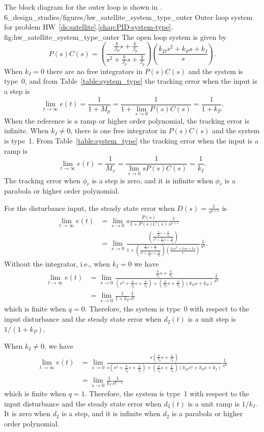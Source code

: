 The block diagram for the outer loop is shown in .
	{6_design_studies/figures/hw_satellite_system_type_outer}
	{Outer loop system for problem HW~\ref{ds:satellite}.\ref{chap:PID-system-type}.}
	{fig:hw_satellite_system_type_outer}
The open loop system is given by
\[
P(s)C(s) = \left(\frac{\frac{b}{J_P}s+\frac{k}{J_p}}{s^2+\frac{b}{J_p}s+\frac{k}{J_p}}\right)\left(\frac{k_Ds^2+k_Ps+k_I}{s}\right).
\]
When $k_I=0$ there are no free integrators in $P(s)C(s)$ and the system is type~0, and from Table~\ref{table:system_type} the tracking error when the input is a step is \[
\lim_{t\to\infty}e(t) = \frac{1}{1+M_p} = \frac{1}{1+\lim_{s\to 0} P(s)C(s)} = \frac{1}{1+k_P}.
\]
When the reference is a ramp or higher order polynomial, the tracking error is infinite.
When $k_I\neq 0$, there is one free integrator in $P(s)C(s)$ and the system is type~1.  From Table~\ref{table:system_type} the tracking error when the input is a ramp is 
\[
\lim_{t\to\infty}e(t) = \frac{1}{M_v} = \frac{1}{\lim_{s\to 0} sP(s)C(s)} = \frac{1}{k_I}.
\]
The tracking error when $\phi_r$ is a step is zero, and it is infinite when $\phi_r$ is a parabola or higher order polynomial.

For the disturbance input, the steady state error when $D(s) = \frac{1}{s^{q+1}}$ is
\begin{align*}
\lim_{t\to\infty}e(t) &= \lim_{s\to 0}s\frac{P(s)}{1+P(s)C(s)}\frac{1}{s^{q+1}} \\
&= \lim_{s\to 0} \frac{\left(\frac{\frac{b}{J_P}s+\frac{k}{J_p}}{s^2+\frac{b}{J_p}s+\frac{k}{J_p}}\right)}{1+\left(\frac{\frac{b}{J_P}s+\frac{k}{J_p}}{s^2+\frac{b}{J_p}s+\frac{k}{J_p}}\right)\left(\frac{k_Ds^2+k_Ps+k_I}{s}\right)}\frac{1}{s^q}.
\end{align*}
Without the integrator, i.e., when $k_I=0$ we have
\begin{align*}
\lim_{t\to\infty}e(t) &= \lim_{s\to 0} \frac{\frac{b}{J_p}s+\frac{k}{J_p}}{(s^2+\frac{b}{J_p}s+\frac{k}{J_p})+(\frac{b}{J_P}s+\frac{k}{J_p})(k_Ds+k_P)}\frac{1}{s^q} \\
&= \lim_{s\to 0} \frac{1}{1+k_P}\frac{1}{s^q}
\end{align*}
which is finite when $q=0$.  Therefore, the system is type~0 with respect to the input disturbance and the steady state error when $d_2(t)$ is a unit step is $1/(1+k_P)$.  

When $k_I\neq 0$, we have
\begin{align*}
\lim_{t\to\infty}e(t) &= \lim_{s\to 0} \frac{s\left(\frac{b}{J_p}s+\frac{k}{J_p}\right)}{s\left(s^2+\frac{b}{J_p}s+\frac{k}{J_p}\right)+\left(\frac{b}{J_p}s+\frac{k}{J_p}\right)\left(k_Ds^2+k_Ps+k_I\right)}\frac{1}{s^q} \\
&= \lim_{s\to 0} \frac{1}{k_I}\frac{1}{s^{q-1}}
\end{align*}
which is finite when $q=1$.  Therefore, the system is type~1 with respect to the input disturbance and the steady state error when $d_2(t)$ is a unit ramp is $1/k_I$.  It is zero when $d_2$ is a step, and it is infinite when $d_2$ is a parabola or higher order polynomial.
